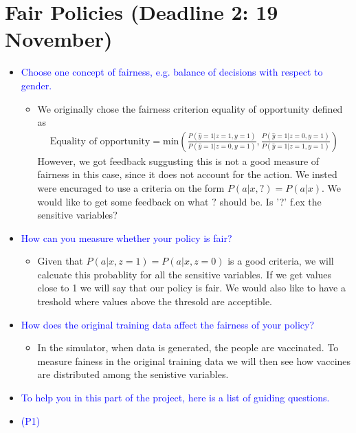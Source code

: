 \documentclass[a4paper, 12pt]{extarticle}
\begin{document}
\section*{Fair Policies (Deadline 2: 19 November)}
\begin{itemize}
    \item \textcolor{blue}{Choose one concept of fairness, e.g. balance of decisions with respect to gender.}
    \begin{itemize}
        \item We originally chose the fairness criterion equality of opportunity defined as 
        \begin{align*}
            \text{Equality of opportunity} = \text{min} \left( \frac{P(\hat{y} = 1 | z = 1, y = 1)}{P(\hat{y} = 1 | z=0, y=1)} , \frac{P(\hat{y} = 1 | z = 0, y = 1)}{P(\hat{y} = 1 | z=1, y=1)}\right)
        \end{align*}
        However, we got feedback suggusting this is not a good measure of fairness in this case, since it does not account for the action. 
        We insted were encuraged to use a criteria on the form $P(a|x,?) = P(a|x)$. 
        We would like to get some feedback on what $?$ should be. Is '?' f.ex the sensitive variables?
    \end{itemize}
    \item \textcolor{blue}{How can you measure whether your policy is fair?}
    \begin{itemize}
        \item Given that $P(a|x,z=1) = P(a|x,z=0)$ is a good criteria, we will calcuate this probablity for all the sensitive variables. If we get values close to 1 we will say that our policy is fair. We would also like to have a treshold where values above the thresold are acceptible.
    \end{itemize}
    \item \textcolor{blue}{How does the original training data affect the fairness of your policy?}
    \begin{itemize}
        \item In the simulator, when data is generated, the people are vaccinated. To measure fainess in the original training data we will then see how vaccines are distributed among the senistive variables. 
    \end{itemize}
    \item \textcolor{blue}{To help you in this part of the project, here is a list of guiding questions.}
    \item \textcolor{blue}{(P1)}

\end{itemize}
\end{document}
